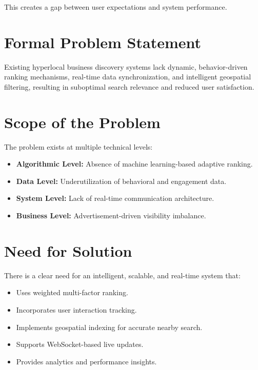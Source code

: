 \documentclass[12pt,a4paper]{report}
\begin{document}
This creates a gap between user expectations and system performance.

\section{Formal Problem Statement}

Existing hyperlocal business discovery systems lack dynamic, behavior-driven ranking mechanisms, real-time data synchronization, and intelligent geospatial filtering, resulting in suboptimal search relevance and reduced user satisfaction.

\section{Scope of the Problem}

The problem exists at multiple technical levels:

\begin{itemize}

\item \textbf{Algorithmic Level:} Absence of machine learning-based adaptive ranking.

\item \textbf{Data Level:} Underutilization of behavioral and engagement data.

\item \textbf{System Level:} Lack of real-time communication architecture.

\item \textbf{Business Level:} Advertisement-driven visibility imbalance.

\end{itemize}

\section{Need for Solution}

There is a clear need for an intelligent, scalable, and real-time system that:

\begin{itemize}

\item Uses weighted multi-factor ranking.

\item Incorporates user interaction tracking.

\item Implements geospatial indexing for accurate nearby search.

\item Supports WebSocket-based live updates.

\item Provides analytics and performance insights.

\end{itemize}
\end{document}
